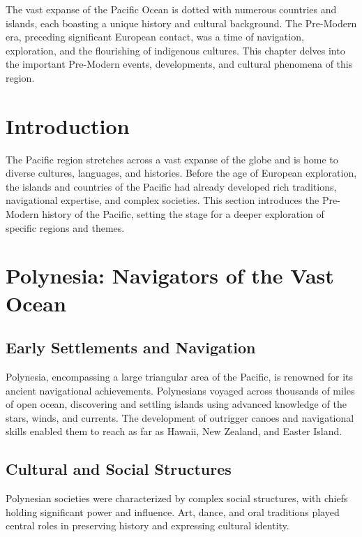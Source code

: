 \documentclass{book}
\begin{document}
The vast expanse of the Pacific Ocean is dotted with numerous countries and islands, each boasting a unique history and cultural background. The Pre-Modern era, preceding significant European contact, was a time of navigation, exploration, and the flourishing of indigenous cultures. This chapter delves into the important Pre-Modern events, developments, and cultural phenomena of this region.

\section{Introduction}
\label{sec:introduction-pre-modern-pacific}

The Pacific region stretches across a vast expanse of the globe and is home to diverse cultures, languages, and histories. Before the age of European exploration, the islands and countries of the Pacific had already developed rich traditions, navigational expertise, and complex societies. This section introduces the Pre-Modern history of the Pacific, setting the stage for a deeper exploration of specific regions and themes.

\section{Polynesia: Navigators of the Vast Ocean}
\label{sec:polynesia}

\subsection{Early Settlements and Navigation}
\label{subsec:polynesia-settlements-navigation}

Polynesia, encompassing a large triangular area of the Pacific, is renowned for its ancient navigational achievements. Polynesians voyaged across thousands of miles of open ocean, discovering and settling islands using advanced knowledge of the stars, winds, and currents. The development of outrigger canoes and navigational skills enabled them to reach as far as Hawaii, New Zealand, and Easter Island.

\subsection{Cultural and Social Structures}
\label{subsec:polynesia-culture-society}

Polynesian societies were characterized by complex social structures, with chiefs holding significant power and influence. Art, dance, and oral traditions played central roles in preserving history and expressing cultural identity.
\end{document}
